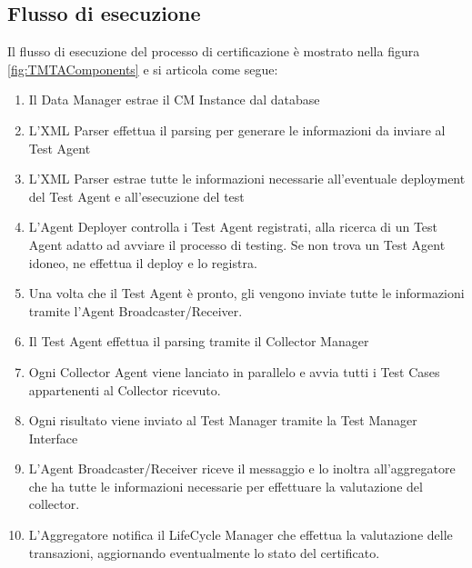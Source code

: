 \documentclass[../main.tex]{subfiles}
\begin{document}
\subsection{Flusso di esecuzione}
Il flusso di esecuzione del processo di certificazione è mostrato nella figura \ref{fig:TMTAComponents} e si articola come segue:
\begin{enumerate}
\item Il Data Manager estrae il CM Instance dal database
\item L'XML Parser effettua il parsing per generare le informazioni da inviare al Test Agent
\item L'XML Parser estrae tutte le informazioni necessarie all'eventuale deployment del Test Agent e all'esecuzione del test
\item L'Agent Deployer controlla i Test Agent registrati, alla ricerca di un Test Agent adatto ad avviare il processo di testing. Se non trova un Test Agent idoneo, ne effettua il deploy e lo registra.
\item Una volta che il Test Agent è pronto, gli vengono inviate tutte le informazioni tramite l'Agent Broadcaster/Receiver.
\item Il Test Agent effettua il parsing tramite il Collector Manager
\item Ogni Collector Agent viene lanciato in parallelo e avvia tutti i Test Cases appartenenti al Collector ricevuto.
\item Ogni risultato viene inviato  al Test Manager tramite la Test Manager Interface
\item L'Agent Broadcaster/Receiver riceve il messaggio e lo inoltra all'aggregatore che ha tutte le informazioni necessarie per effettuare la valutazione del collector.
\item L'Aggregatore notifica il LifeCycle Manager che effettua la valutazione delle transazioni, aggiornando eventualmente lo stato del certificato.
\end{enumerate}
\end{document}
